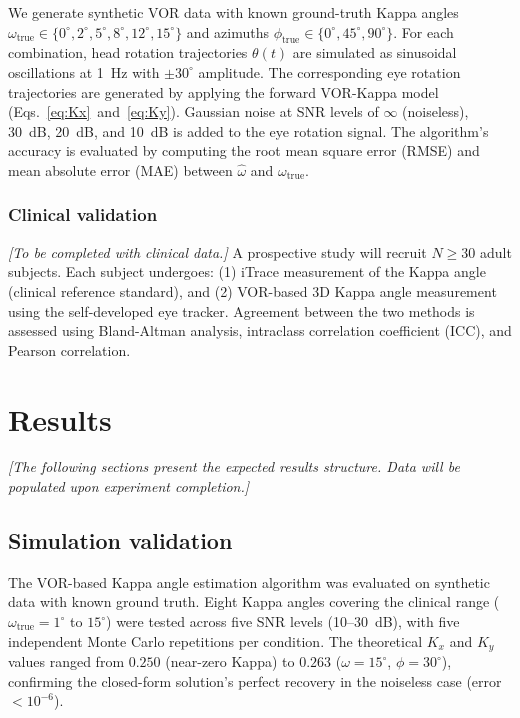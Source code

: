 \documentclass[review,numbers,sort&compress]{elsarticle}
\begin{document}
We generate synthetic VOR data with known ground-truth Kappa angles $\omega_{\text{true}} \in \{0^\circ, 2^\circ, 5^\circ, 8^\circ, 12^\circ, 15^\circ\}$ and azimuths $\phi_{\text{true}} \in \{0^\circ, 45^\circ, 90^\circ\}$. For each combination, head rotation trajectories $\theta(t)$ are simulated as sinusoidal oscillations at 1~Hz with $\pm30^\circ$ amplitude. The corresponding eye rotation trajectories are generated by applying the forward VOR-Kappa model (Eqs.~\ref{eq:Kx}~and~\ref{eq:Ky}). Gaussian noise at SNR levels of $\infty$ (noiseless), 30~dB, 20~dB, and 10~dB is added to the eye rotation signal. The algorithm's accuracy is evaluated by computing the root mean square error (RMSE) and mean absolute error (MAE) between $\hat{\omega}$ and $\omega_{\text{true}}$.

\subsubsection{Clinical validation}

\textit{[To be completed with clinical data.]} A prospective study will recruit $N \geq 30$ adult subjects. Each subject undergoes: (1) iTrace measurement of the Kappa angle (clinical reference standard), and (2) VOR-based 3D Kappa angle measurement using the self-developed eye tracker. Agreement between the two methods is assessed using Bland-Altman analysis, intraclass correlation coefficient (ICC), and Pearson correlation.

\section{Results}

\textit{[The following sections present the expected results structure. Data will be populated upon experiment completion.]}

\subsection{Simulation validation}

The VOR-based Kappa angle estimation algorithm was evaluated on synthetic data with known ground truth. Eight Kappa angles covering the clinical range ($\omega_{\text{true}} = 1^\circ$ to $15^\circ$) were tested across five SNR levels (10--30~dB), with five independent Monte Carlo repetitions per condition. The theoretical $K_x$ and $K_y$ values ranged from $0.250$ (near-zero Kappa) to $0.263$ ($\omega = 15^\circ$, $\phi = 30^\circ$), confirming the closed-form solution's perfect recovery in the noiseless case (error $< 10^{-6}$).
\end{document}
